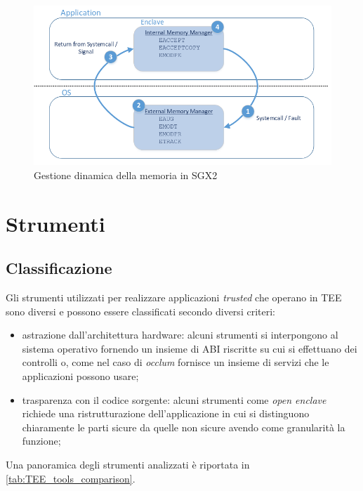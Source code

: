 \documentclass{article}
\begin{document}
\begin{figure}
  \begin{center}
    \includegraphics[width=.65\textwidth]{figures/ch1/sgx2.png}
  \end{center}
  \caption{Gestione dinamica della memoria in SGX2}\label{fig:sgx2}
\end{figure}

\clearpage
\section{Strumenti}
\subsection{Classificazione}\label{sec:classification}
Gli strumenti utilizzati per realizzare applicazioni \textit{trusted} che operano in TEE sono diversi e possono essere classificati secondo diversi criteri:
\begin{itemize}
  \item astrazione dall'architettura hardware: alcuni strumenti si interpongono al sistema operativo fornendo un insieme di ABI riscritte su cui si effettuano dei controlli o, come nel caso di \textit{occlum} fornisce un insieme di servizi che le applicazioni possono usare;
  \item trasparenza con il codice sorgente: alcuni strumenti come \textit{open enclave} richiede una ristrutturazione dell'applicazione in cui si distinguono chiaramente le parti sicure da quelle non sicure avendo come granularità la funzione;
\end{itemize}

Una panoramica degli strumenti analizzati è riportata in \cref{tab:TEE_tools_comparison}.
\end{document}
